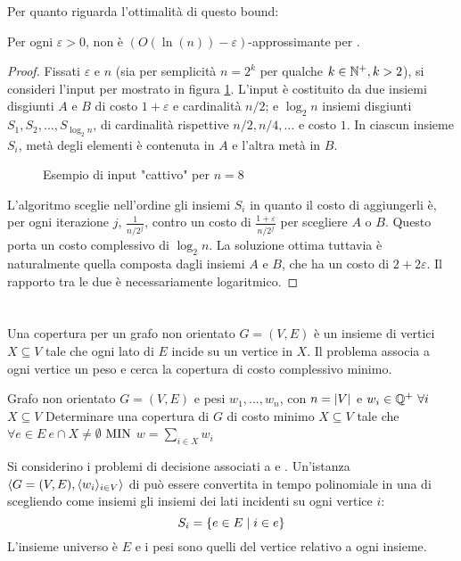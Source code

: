 Per quanto riguarda l'ottimalità di questo bound:
\begin{theorem}
	Per ogni $\varepsilon>0$, \GreedySetCover non è $(O(\ln(n))-\varepsilon)$-approssimante per \MinSetCover.
\end{theorem}
\begin{proof}
	Fissati $\varepsilon$ e $n$ (sia per semplicità $n=2^k$ per qualche $k\in\mathbb N^+,k>2$), si consideri l'input per \MinSetCover mostrato in figura \ref{fig:setcover_tightness}.
	L'input è costituito da due insiemi disgiunti $A$ e $B$ di costo $1+\varepsilon$ e cardinalità $n/2$; e $\log_2 n$ insiemi disgiunti $S_1,S_2,\dots,S_{\log_2 n}$, di cardinalità rispettive $n/2,n/4,\dots$ e costo $1$. In ciascun insieme $S_i$, metà degli elementi è contenuta in $A$ e l'altra metà in $B$.

	\begin{figure}[ht]
		\centering
		
		\caption{Esempio di input "cattivo" per $n=8$}
		\label{fig:setcover_tightness}
	\end{figure}

	L'algoritmo sceglie nell'ordine gli insiemi $S_i$ in quanto il costo di aggiungerli è, per ogni iterazione $j$, $\frac{1}{n/2^j}$, contro un costo di $\frac{1+\varepsilon}{n/2^j}$ per scegliere $A$ o $B$.
	Questo porta un costo complessivo di $\log_2 n$. La soluzione ottima tuttavia è naturalmente quella composta dagli insiemi $A$ e $B$, che ha un costo di $2+2\varepsilon$. Il rapporto tra le due è necessariamente logaritmico.
\end{proof}



\section{\VertexCover}
Una copertura per un grafo non orientato $G=(V,E)$ è un insieme di vertici $X\subseteq V$ tale che ogni lato di $E$ incide su un vertice in $X$.
Il problema \VertexCover associa a ogni vertice un peso e cerca la copertura di costo complessivo minimo.

\popt{\VertexCover}
{Grafo non orientato $G=(V,E)$ e pesi $w_1,\dots,w_n$, con $n=| V |$ e $w_i\in\mathbb Q^+~\forall i$}
{$X\subseteq V$}
{Determinare una copertura di $G$ di costo minimo}
{$X\subseteq V$ tale che $\forall e\in E ~ e\cap X\neq\emptyset$}
{$\mathrm{MIN}$}
{$w=\sum_{i\in X} w_i$}

Si considerino i problemi di decisione associati a \VertexCover e \MinSetCover.
Un'istanza $\langle G=(V,E),\langle w_i \rangle_{i\in V} \rangle$ di \VertexCover può essere convertita in tempo polinomiale in una di \MinSetCover scegliendo come insiemi gli insiemi dei lati incidenti su ogni vertice $i$:
\begin{equation*}
	S_i=\left\{ e\in E\mid i\in e \right\}
\end{equation*}
L'insieme universo è $E$ e i pesi sono quelli del vertice relativo a ogni insieme.

